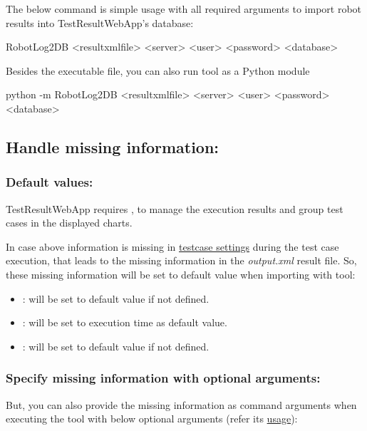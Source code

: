 The below command is simple usage with all required arguments to import 
robot results into TestResultWebApp's database:
\begin{robotlog}
RobotLog2DB <resultxmlfile> <server> <user> <password> <database>
\end{robotlog}

Besides the executable file, you can also run tool as a Python module
\begin{robotlog}
python -m RobotLog2DB <resultxmlfile> <server> <user> <password> <database>
\end{robotlog}

\subsection{Handle missing information:}
\subsubsection{Default values:}
TestResultWebApp requires ,  to manage the 
execution results and  group test cases in the displayed charts.

In case above information is missing in \hyperref[description-robotframework-testcase-settings]
{testcase settings} during the test case execution, that leads to the 
missing information in the \emph{output.xml} result file.
So, these missing information will be set to default value when importing with
\href{https://github.com/test-fullautomation/robotframework-robotlog2db}{\pkg}
tool:

\begin{itemize}
\tightlist
\item {}: will be set to default value  if not defined.

\item {}: will be set to execution time
   as default value.

\item {}: will be set to default value  if not
  defined.
\end{itemize}

\subsubsection{Specify missing information with optional arguments:}
But, you can also provide the missing information as command arguments when executing the
\href{https://github.com/test-fullautomation/robotframework-robotlog2db}{\pkg}
tool with below optional arguments (refer its
\href{https://github.com/test-fullautomation/robotframework-robotlog2db\#usage}{usage}):

